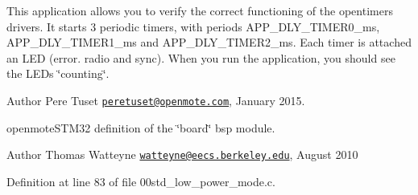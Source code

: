 This application allows you to verify the correct functioning of the opentimers drivers. It starts 3 periodic timers, with periods A\+P\+P\+\_\+\+D\+L\+Y\+\_\+\+T\+I\+M\+E\+R0\+\_\+ms, A\+P\+P\+\_\+\+D\+L\+Y\+\_\+\+T\+I\+M\+E\+R1\+\_\+ms and A\+P\+P\+\_\+\+D\+L\+Y\+\_\+\+T\+I\+M\+E\+R2\+\_\+ms. Each timer is attached an L\+ED (error. radio and sync). When you run the application, you should see the L\+E\+Ds \char`\"{}counting\char`\"{}.

\begin{DoxyAuthor}{Author}
Pere Tuset \href{mailto:peretuset@openmote.com}{\tt peretuset@openmote.\+com}, January 2015.
\end{DoxyAuthor}
openmote\+S\+T\+M32 definition of the \char`\"{}board\char`\"{} bsp module.

\begin{DoxyAuthor}{Author}
Thomas Watteyne \href{mailto:watteyne@eecs.berkeley.edu}{\tt watteyne@eecs.\+berkeley.\+edu}, August 2010 
\end{DoxyAuthor}


Definition at line 83 of file 00std\+\_\+low\+\_\+power\+\_\+mode.\+c.

